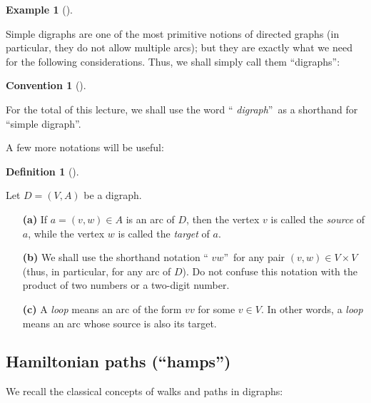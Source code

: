\documentclass[numbers=enddot,12pt,final,onecolumn,notitlepage]{scrartcl}%
\numberwithin{exer}{subsection}
\theoremstyle{definition}
\newtheorem{defi}[theo]{Definition}
\newenvironment{definition}[1][]
{\begin{defi}[#1]\begin{leftbar}}
{\end{leftbar}\end{defi}}
\newtheorem{conv}[theo]{Convention}
\newenvironment{convention}[1][]
{\begin{conv}[#1]\begin{leftbar}}
{\end{leftbar}\end{conv}}
\newtheorem{exam}[theo]{Example}
\newenvironment{example}[1][]
{\begin{exam}[#1]\begin{leftbar}}
{\end{leftbar}\end{exam}}
\begin{document}
\begin{example}
\begin{enumerate}
\end{enumerate}
\end{example}

Simple digraphs are one of the most primitive notions of directed graphs (in
particular, they do not allow multiple arcs); but they are exactly what we
need for the following considerations. Thus, we shall simply call them
\textquotedblleft digraphs\textquotedblright:

\begin{convention}
For the total of this lecture, we shall use the word \textquotedblleft%
\emph{digraph}\textquotedblright\ as a shorthand for \textquotedblleft simple
digraph\textquotedblright.
\end{convention}

A few more notations will be useful:

\begin{definition}
\label{def.digraph.notations}Let $D=\left(  V,A\right)  $ be a digraph.

\begin{enumerate}
\item[\textbf{(a)}] If $a=\left(  v,w\right)  \in A$ is an arc of $D$, then
the vertex $v$ is called the \emph{source} of $a$, while the vertex $w$ is
called the \emph{target} of $a$.

\item[\textbf{(b)}] We shall use the shorthand notation \textquotedblleft%
$vw$\textquotedblright\ for any pair $\left(  v,w\right)  \in V\times V$
(thus, in particular, for any arc of $D$). Do not confuse this notation with
the product of two numbers or a two-digit number.

\item[\textbf{(c)}] A \emph{loop} means an arc of the form $vv$ for some $v\in
V$. In other words, a \emph{loop} means an arc whose source is also its target.
\end{enumerate}
\end{definition}

\subsection{Hamiltonian paths (\textquotedblleft hamps\textquotedblright)}

We recall the classical concepts of walks and paths in digraphs:
\end{document}
